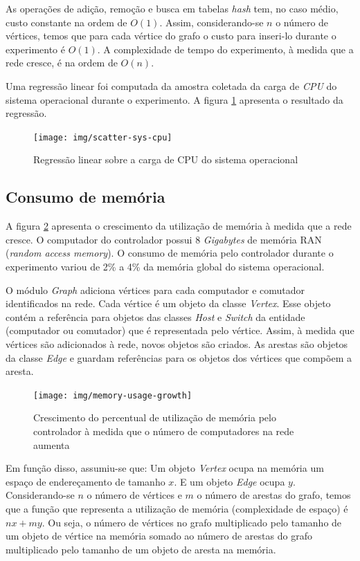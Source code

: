 As operações de adição, remoção e busca em tabelas \emph{hash} tem, no
caso médio, custo constante na ordem de $O(1)$.
Assim, considerando-se $n$ o número de vértices, temos que para cada
vértice do grafo o custo para inseri-lo durante o experimento é $O(1)$.
A complexidade de tempo do experimento, à medida que a rede cresce, é na
ordem de $O(n)$.

Uma regressão linear foi computada da amostra coletada da carga de \emph{CPU}
do sistema operacional durante o experimento.
A figura \ref{fig:scatter-sys-cpu} apresenta o resultado da regressão.

\begin{figure}[!htb]
    \centering
    \label{fig:scatter-sys-cpu}
    \texttt{[image: img/scatter-sys-cpu]}
    \caption{Regressão linear sobre a carga de CPU do sistema operacional}
\end{figure}


\subsection{Consumo de memória}

A figura \ref{fig:memory-usage-growth} apresenta o crescimento da utilização
de memória à medida que a rede cresce.
O computador do controlador possui 8 \emph{Gigabytes} de memória RAN
(\emph{random access memory}).
O consumo de memória pelo controlador durante o experimento variou de 2\% a 4\%
da memória global do sistema operacional.

O módulo \emph{Graph} adiciona vértices para cada computador e comutador
identificados na rede.
Cada vértice é um objeto da classe \emph{Vertex}.
Esse objeto contém a referência para objetos das classes \emph{Host} e
\emph{Switch} da entidade (computador ou comutador) que é representada pelo
vértice.
Assim, à medida que vértices são adicionados à rede, novos objetos são
criados.
As arestas são objetos da classe \emph{Edge} e guardam referências para
os objetos dos vértices que compõem a aresta.

\break
\begin{figure}[!htb]
    \centering
    \label{fig:memory-usage-growth}
    \texttt{[image: img/memory-usage-growth]}
    \caption{Crescimento do percentual de utilização de memória pelo
    controlador à medida que o número de computadores na rede aumenta}
\end{figure}

Em função disso, assumiu-se que: Um objeto \emph{Vertex} ocupa na memória um
espaço de endereçamento de tamanho $x$.
E um objeto \emph{Edge} ocupa $y$.
Considerando-se $n$ o número de vértices e $m$ o número de arestas do grafo,
temos que a função que representa a utilização de memória (complexidade de
espaço) é $nx + my$.
Ou seja, o número de vértices no grafo multiplicado pelo tamanho de um
objeto de vértice na memória somado ao número de arestas do grafo
multiplicado pelo tamanho de um objeto de aresta na memória.


